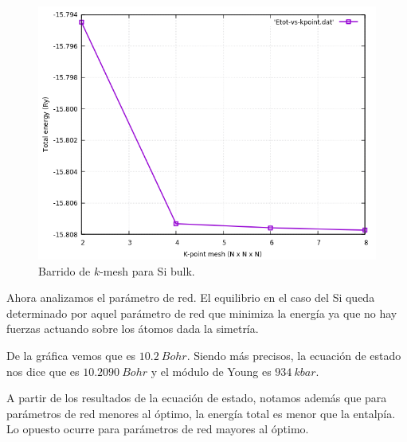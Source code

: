       \begin{figure}[H]
          \centering
          \includegraphics[scale = 0.6]{figs/D2/Si_k.png}
          \caption{Barrido de $k$-mesh para Si bulk.}
      \end{figure}


    Ahora analizamos el parámetro de red. El equilibrio en el caso del Si queda determinado por aquel parámetro de red que minimiza la energía ya que no hay fuerzas actuando sobre los átomos dada la simetría.


    De la gráfica vemos que es $10.2\ Bohr$. Siendo más precisos, la ecuación de estado nos dice que es $10.2090\ Bohr$ y el módulo de Young es $934\ kbar$.

    A partir de los resultados de la ecuación de estado, notamos además que para parámetros de red menores al óptimo, la energía total es menor que la entalpía. Lo opuesto ocurre para parámetros de red mayores al óptimo.

